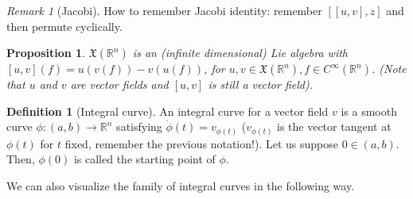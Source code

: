\documentclass[a4paper,11pt,titlepage, article, oneside]{memoir}
\numberwithin{equation}{section}
\newtheorem{proposition}[theorem]{Proposition}
\theoremstyle{definition}
\newtheorem{definition}[theorem]{Definition}
\theoremstyle{remark}
\newtheorem{remark}[theorem]{Remark}
\newcommand{\rfield}{\mathbb{R}}
\begin{document}
\begin{remarkbox}\begin{remark}[Jacobi]
  How to remember Jacobi identity: remember $[[u, v], z]$ and then  permute cyclically.
\end{remark}\end{remarkbox}

\begin{proposition}
  $\mathfrak{X}(\rfield^n)$ is an (infinite dimensional) Lie algebra with $[u, v](f) = u(v(f)) - v(u(f))$, for $u, v \in \mathfrak{X}(\rfield^n), f \in C^\infty(\rfield^n)$. (Note that $u$ and $v$ are vector fields and $[u, v]$ is still a vector field).
\end{proposition}

\begin{definition}[Integral curve]
  An integral curve for a vector field $v$ is a smooth curve $\phi \colon (a, b) \rightarrow \rfield^n$ satisfying $\dot\phi(t) = v_{\phi(t)}$ ($v_{\phi(t)}$ is the vector tangent at $\phi(t)$ for $t$ fixed, remember the previous notation!). Let us suppose $0 \in (a, b)$. Then, $\phi(0)$ is called the starting point of $\phi$.
\end{definition}

We can also visualize the family of integral curves in the following way.
\end{document}
